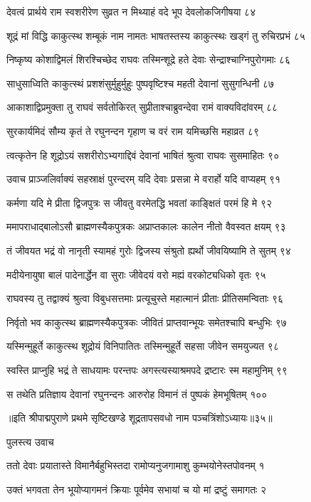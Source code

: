 देवत्वं प्रार्थये राम स्वशरीरेण सुव्रत
न मिथ्याहं वदे भूप देवलोकजिगीषया ८४

शूद्रं मां विद्धि काकुत्स्थ शम्बूकं नाम नामतः
भाषतस्तस्य काकुत्स्थः खड्गं तु रुचिरप्रभं ८५

निष्कृष्य कोशाद्विमलं शिरश्चिच्छेद राघवः
तस्मिन्शूद्रे हते देवाः सेन्द्राश्चाग्निपुरोगमाः ८६

साधुसाध्विति काकुत्स्थं प्रशशंसुर्मुहुर्मुहुः
पुष्पवृष्टिश्च महती देवानां सुसुगन्धिनी ८७

आकाशाद्विप्रमुक्ता तु राघवं सर्वतोकिरत्
सुप्रीताश्चाब्रुवन्देवा रामं वाक्यविदांवरम् ८८

सुरकार्यमिदं सौम्य कृतं ते रघुनन्दन
गृहाण च वरं राम यमिच्छसि महाव्रत ८९

त्वत्कृतेन हि शूद्रोऽयं सशरीरोऽभ्यगाद्दिवं
देवानां भाषितं श्रुत्वा राघवः सुसमाहितः ९०

उवाच प्राञ्जलिर्वाक्यं सहस्राक्षं पुरन्दरम्
यदि देवाः प्रसन्ना मे वरार्हो यदि वाप्यहम् ९१

कर्मणा यदि मे प्रीता द्विजपुत्रः स जीवतु
वरमेतद्धि भवतां काङ्क्षितं परमं हि मे ९२

ममापराधाद्बालोऽसौ ब्राह्मणस्यैकपुत्रकः
अप्राप्तकालः कालेन नीतो वैवस्वत क्षयम् ९३

तं जीवयत भद्रं वो नानृती स्यामहं गुरोः
द्विजस्य संश्रुतो ह्यर्थो जीवयिष्यामि ते सुतम् ९४

मदीयेनायुषा बालं पादेनार्द्धेन वा सुराः
जीवेदयं वरो मह्यं वरकोट्यधिको वृतः ९५

राघवस्य तु तद्वाक्यं श्रुत्वा विबुधसत्तमाः
प्रत्यूचुस्ते महात्मानं प्रीताः प्रीतिसमन्विताः ९६

निर्वृतो भव काकुत्स्थ ब्राह्मणस्यैकपुत्रकः
जीवितं प्राप्तवान्भूयः समेतश्चापि बन्धुभिः ९७

यस्मिन्मुहूर्ते काकुत्स्थ शूद्रोयं विनिपातितः
तस्मिन्मुहूर्ते सहसा जीवेन समयुज्यत ९८

स्वस्ति प्राप्नुहि भद्रं ते साधयामः परन्तपः
अगस्त्यस्याश्रमपदे द्रष्टारः स्म महामुनिम् ९९

स तथेति प्रतिज्ञाय देवानां रघुनन्दनः
आरुरोह विमानं तं पुष्पकं हेमभूषितम् १००

॥इति श्रीपाद्मपुराणे प्रथमे सृष्टिखण्डे शूद्रतापसवधो नाम पञ्चत्रिंशोऽध्यायः॥३५॥


पुलस्त्य उवाच

ततो देवाः प्रयातास्ते विमानैर्बहुभिस्तदा
रामोप्यनुजगामाशु कुम्भयोनेस्तपोवनम् १

उक्तं भगवता तेन भूयोप्यागमनं क्रियाः
पूर्वमेव सभायां च यो मां द्रष्टुं समागतः २

